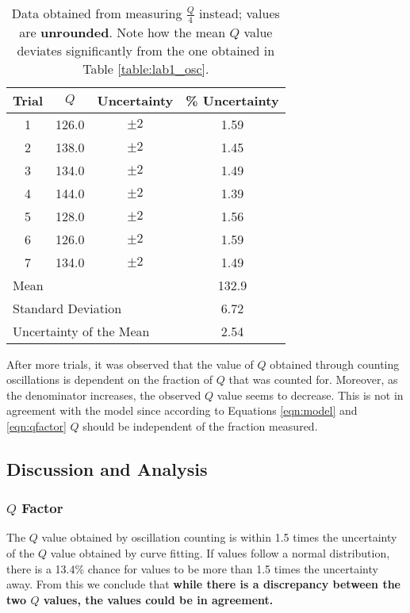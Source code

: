 \documentclass[aps,twocolumn,secnumarabic,nobalancelastpage,amsmath,amssymb,nofootinbib,floatfix,letterpaper]{revtex4}
\begin{document}
\begin{table}[h]
    \begin{tabular}{c|c|c|c}
        Trial & \(Q\) & Uncertainty & \% Uncertainty \\
        \hline
        1   & 126.0 & \(\pm 2\) & 1.59 \\
        2   & 138.0 & \(\pm 2\) & 1.45 \\
        3	& 134.0 & \(\pm 2\) & 1.49 \\
        4	& 144.0 & \(\pm 2\) & 1.39 \\
        5	& 128.0 & \(\pm 2\) & 1.56 \\
        6	& 126.0 & \(\pm 2\) & 1.59 \\
        7	& 134.0 & \(\pm 2\) & 1.49 \\
        \hline
        \multicolumn{3}{l}{Mean} & 132.9 \\
        \multicolumn{3}{l}{Standard Deviation} & 6.72 \\
        \multicolumn{3}{l}{Uncertainty of the Mean} & 2.54
    \end{tabular}
    \caption{Data obtained from measuring \(\frac{Q}{4}\) instead; values are \textbf{unrounded}. Note how the mean
        \(Q\) value deviates significantly from the one obtained in Table \ref{table:lab1_osc}.}
    \label{table:lab1_osc4}
\end{table}

After more trials, it was observed that the value of \(Q\) obtained through counting oscillations is dependent on the
fraction of \(Q\) that was counted for. Moreover, as the denominator increases, the observed \(Q\) value seems to
decrease. This is not in agreement with the model since according to Equations \ref{eqn:model} and \ref{eqn:qfactor}
\(Q\) should be independent of the fraction measured.

\subsection{Discussion and Analysis}
\label{sec:lab1_analysis}

\subsubsection{\texorpdfstring{\(Q\)}{Q} Factor}

The \(Q\) value obtained by oscillation counting is within 1.5 times the uncertainty of the \(Q\) value obtained by
curve fitting. If values follow a normal distribution, there is a 13.4\% chance for values to be more than 1.5 times the
uncertainty away. From this we conclude that \textbf{while there is a discrepancy between the two \(Q\) values, the
values could be in agreement.}
\end{document}
